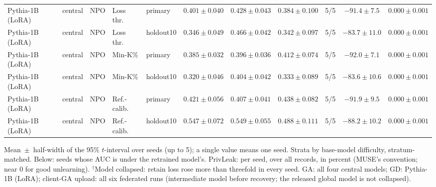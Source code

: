{\begin{longtable}{@{\extracolsep{\fill}}lllllcccccc@{}}
Pythia-1B (LoRA) & central & NPO & Loss thr. & primary & $0.401 \pm 0.040$ & $0.428 \pm 0.043$ & $0.384 \pm 0.100$ & 5/5 & $-91.4 \pm 7.5$ & $0.000 \pm 0.001$ \\
Pythia-1B (LoRA) & central & NPO & Loss thr. & holdout10 & $0.346 \pm 0.049$ & $0.466 \pm 0.042$ & $0.342 \pm 0.097$ & 5/5 & $-83.7 \pm 11.0$ & $0.000 \pm 0.001$ \\
Pythia-1B (LoRA) & central & NPO & Min-K\% & primary & $0.385 \pm 0.032$ & $0.396 \pm 0.036$ & $0.412 \pm 0.074$ & 5/5 & $-92.0 \pm 7.1$ & $0.000 \pm 0.001$ \\
Pythia-1B (LoRA) & central & NPO & Min-K\% & holdout10 & $0.320 \pm 0.046$ & $0.404 \pm 0.042$ & $0.333 \pm 0.089$ & 5/5 & $-83.6 \pm 10.6$ & $0.000 \pm 0.001$ \\
Pythia-1B (LoRA) & central & NPO & Ref.-calib. & primary & $0.421 \pm 0.056$ & $0.407 \pm 0.041$ & $0.438 \pm 0.082$ & 5/5 & $-91.9 \pm 9.5$ & $0.000 \pm 0.001$ \\
Pythia-1B (LoRA) & central & NPO & Ref.-calib. & holdout10 & $0.547 \pm 0.072$ & $0.549 \pm 0.055$ & $0.488 \pm 0.111$ & 5/5 & $-88.2 \pm 10.2$ & $0.000 \pm 0.001$ \\
\end{longtable}
Mean~$\pm$~half-width of the 95\% $t$-interval over seeds (up to 5); a single value means one seed. Strata by base-model difficulty, stratum-matched. Below: seeds whose AUC is under the retrained model's. PrivLeak: per seed, over all records, in percent (MUSE's convention; near 0 for good unlearning). $^{\dagger}$Model collapsed: retain loss rose more than threefold in every seed. GA: all four central models; GD: Pythia-1B (LoRA); client-GA upload: all six federated runs (intermediate model before recovery; the released global model is not collapsed).\par
}
